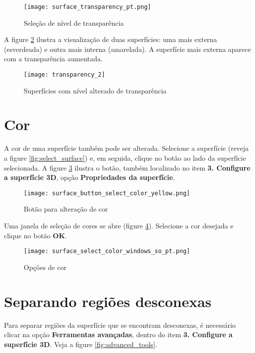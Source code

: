 \begin{figure}[!htb]
\centering
\texttt{[image: surface\_transparency\_pt.png]}
\caption{Seleção de nível de transparência}
\label{fig:select_transparency}
\end{figure}

A figure \ref{fig:model_transparency} ilustra a visualização de duas superfícies: uma mais externa
(esverdeada) e outra mais interna (amarelada). A superfície mais externa aparece com a transparência
aumentada.

\begin{figure}[!htb]
\centering
\texttt{[image: transparency\_2]}
\caption{Superfícies com nível alterado de transparência}
\label{fig:model_transparency}
\end{figure}

\newpage

\section{Cor}

A cor de uma superfície também pode ser alterada. Selecione a superfície (reveja a figure
\ref{fig:select_surface}) e, em seguida, clique no botão ao lado da superfície selecionada. A figure
\ref{fig:change_surface_color} ilustra o botão, também localizado no item \textbf{3. Configure a
superfície 3D}, opção \textbf{Propriedades da superfície}.

\begin{figure}[!htb]
\centering
\texttt{[image: surface\_button\_select\_color\_yellow.png]}
\caption{Botão para alteração de cor}
\label{fig:change_surface_color}
\end{figure}

Uma janela de seleção de cores se abre (figure \ref{fig:button_select_color}). Selecione a cor
desejada e clique no botão \textbf{OK}.

\begin{figure}[!htb]
\centering
\texttt{[image: surface\_select\_color\_windows\_so\_pt.png]}
\caption{Opções de cor}
\label{fig:button_select_color}
\end{figure}

\section{Separando regiões desconexas}

Para separar regiões da superfície que se encontram desconexas, é necessário clicar na opção
\textbf{Ferramentas avançadas}, dentro do item \textbf{3. Configure a superfície 3D}. Veja a
figure \ref{fig:advanced_tools}.

